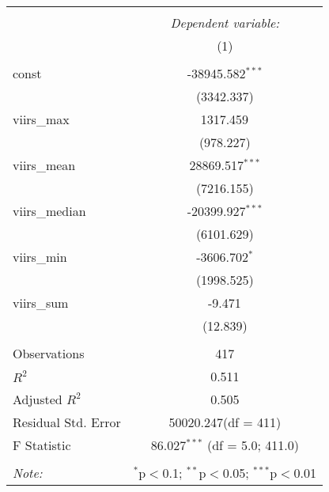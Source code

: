 \begin{table}[!htbp] \centering
\begin{tabular}{@{\extracolsep{5pt}}lc}
\\[-1.8ex]\hline
\hline \\[-1.8ex]
& \multicolumn{1}{c}{\textit{Dependent variable:}} \
\cr \cline{1-2}
\\[-1.8ex] & (1) \\
\hline \\[-1.8ex]
 const & -38945.582$^{***}$ \\
  & (3342.337) \\
 viirs_max & 1317.459$^{}$ \\
  & (978.227) \\
 viirs_mean & 28869.517$^{***}$ \\
  & (7216.155) \\
 viirs_median & -20399.927$^{***}$ \\
  & (6101.629) \\
 viirs_min & -3606.702$^{*}$ \\
  & (1998.525) \\
 viirs_sum & -9.471$^{}$ \\
  & (12.839) \\
\hline \\[-1.8ex]
 Observations & 417 \\
 $R^2$ & 0.511 \\
 Adjusted $R^2$ & 0.505 \\
 Residual Std. Error & 50020.247(df = 411)  \\
 F Statistic & 86.027$^{***}$ (df = 5.0; 411.0) \\
\hline
\hline \\[-1.8ex]
\textit{Note:} & \multicolumn{1}{r}{$^{*}$p$<$0.1; $^{**}$p$<$0.05; $^{***}$p$<$0.01} \\
\end{tabular}
\end{table}